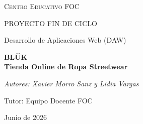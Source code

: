 \documentclass[12pt,a4paper]{report}
\begin{document}
\begin{titlepage}
    \centering
    \vspace*{2cm}
    {\scshape\LARGE Centro Educativo FOC \par}
    \vspace{1.5cm}
    {\scshape\Large PROYECTO FIN DE CICLO \par}
    \vspace{0.5cm}
    {\large Desarrollo de Aplicaciones Web (DAW) \par}
    \vspace{1.5cm}
    {\Huge\bfseries BLÜK \\ Tienda Online de Ropa Streetwear \par}
    \vspace{2cm}
    {\Large\itshape Autores: Xavier Morro Sanz y Lidia Vargas \par}
    \vspace{1cm}
    {\large Tutor: Equipo Docente FOC \par}
    \vfill
    {\large Junio de 2026 \par}
\end{titlepage}

\tableofcontents
\listoffigures
\listoftables

\clearpage








\end{document}
